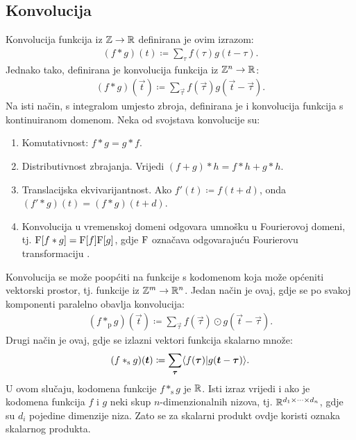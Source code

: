 \documentclass[utf8, diplomski, lmodern]{fer}
\begin{document}
\subsection{Konvolucija}

Konvolucija funkcija iz $\mathbb{Z}\to\mathbb{R}$ definirana je ovim izrazom:
\begin{align}
(f*g)(t) \coloneqq \sum_\tau f(\tau)g(t-\tau) \text{.}
\end{align}
Jednako tako, definirana je konvolucija funkcija iz $\mathbb{Z}^n\to\mathbb{R}$:
\begin{align}
(f*g)(\vec t) \coloneqq \sum_{\vec\tau} f(\vec\tau)g(\vec t-\vec\tau) \text{.}
\end{align}
Na isti način, s integralom umjesto zbroja, definirana je i konvolucija funkcija s kontinuiranom domenom. Neka od svojstava konvolucije su:
\begin{enumerate}
	\item Komutativnost: $f*g=g*f$.
	\item Distributivnost zbrajanja. Vrijedi $(f+g)*h=f*h+g*h$.	
	\item Translacijska ekvivarijantnost. Ako $f'(t) \coloneqq f(t+d)$, onda $(f'*g)(t)=(f*g)(t+d)$.
	\item Konvolucija u vremenskoj domeni odgovara umnošku u Fourierovoj domeni, tj. $\mathrm{F}[f*g]=\mathrm{F}[f]\mathrm{F}[g]$, gdje $\mathrm{F}$ označava odgovarajuću Fourierovu transformaciju \citep{Jeren:2015:SISC55}.
\end{enumerate}

Konvolucija se može poopćiti na funkcije s kodomenom koja može općeniti vektorski prostor, tj. funkcije iz $\mathbb{Z}^m\to\mathbb{R}^n$. Jedan način je ovaj, gdje se po svakoj komponenti paralelno obavlja konvolucija:
\begin{align}
(f*_\text{p}g)(\vec t) \coloneqq 
\sum_{\vec\tau} f(\vec\tau)\odot g(\vec t-\vec\tau) \text{.}
\end{align}
Drugi način je ovaj, gdje se izlazni vektori funkcija skalarno množe:
\begin{align} \label{eq:konvolucija-s}
(f*_\text{s}g)(\vec t) \coloneqq 
\sum_{\vec\tau} \braket{f(\vec\tau)}{g(\vec t-\vec\tau)} \text{.}
\end{align}
U ovom slučaju, kodomena funkcije $f*_\text{s}g$ je $\mathbb{R}$. Isti izraz vrijedi i ako je kodomena funkcija $f$ i $g$ neki skup $n$-dimenzionalnih nizova, tj. $\mathbb{R}^{d_1\times\dots\times d_n}$, gdje su $d_i$ pojedine dimenzije niza. Zato se za skalarni produkt ovdje koristi oznaka skalarnog produkta.
\end{document}
